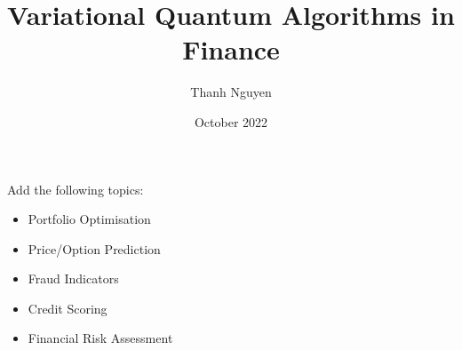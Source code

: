 \documentclass[oneside,notitlepage,12pt]{article}
\title{Variational Quantum Algorithms in Finance}
\author{Thanh Nguyen}
\date{October 2022}
\theoremstyle{definition}
\theoremstyle{remark}
\begin{document}
% 

\maketitle


\tableofcontents
\pagebreak



\begin{framed}
	Add the following topics:
	\begin{itemize}
		\item Portfolio Optimisation
		\item Price/Option Prediction
		\item Fraud Indicators
		\item Credit Scoring
		\item Financial Risk Assessment
	\end{itemize}
\end{framed}







\end{document}
